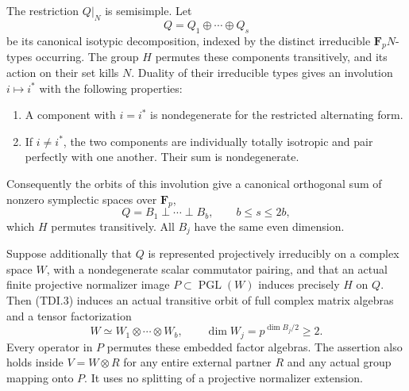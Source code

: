 \begin{lemma}[D-TD20]
The restriction \(Q|_N\) is semisimple. Let
\[
                     Q=Q_1\oplus\cdots\oplus Q_s
 \tag{TDI.2}
\]
be its canonical isotypic decomposition, indexed by the distinct
irreducible \(\mathbf F_pN\)-types occurring. The group \(H\)
permutes these components transitively, and its action on their set
kills \(N\). Duality of their irreducible types gives an involution
\(i\mapsto i^*\) with the following properties:
\begin{enumerate}
\item A component with \(i=i^*\) is nondegenerate for the restricted
alternating form.
\item If \(i\ne i^*\), the two components are individually totally
isotropic and pair perfectly with one another. Their sum is
nondegenerate.
\end{enumerate}
Consequently the orbits of this involution give a canonical orthogonal
sum of nonzero symplectic spaces over \(\mathbf F_p\),
\[
                    Q=B_1\perp\cdots\perp B_b,
                     \qquad b\le s\le2b,
 \tag{TDI.3}
\]
which \(H\) permutes transitively. All \(B_j\) have the same even
dimension.

Suppose additionally that \(Q\) is represented projectively
irreducibly on a complex space \(W\), with a nondegenerate scalar
commutator pairing, and that an actual finite projective normalizer image
\(P\subset\operatorname{PGL}(W)\) induces precisely \(H\) on \(Q\).
Then (TDI.3) induces an actual transitive orbit of full complex
matrix algebras and a tensor factorization
\[
       W\simeq W_1\otimes\cdots\otimes W_b,
                 \qquad \dim W_j=p^{\dim B_j/2}\ge2.
 \tag{TDI.4}
\]
Every operator in \(P\) permutes these embedded factor algebras.
The assertion also holds inside \(V=W\otimes R\) for any entire
external partner \(R\) and any actual group mapping onto \(P\).
It uses no splitting of a projective normalizer extension.
\end{lemma}


